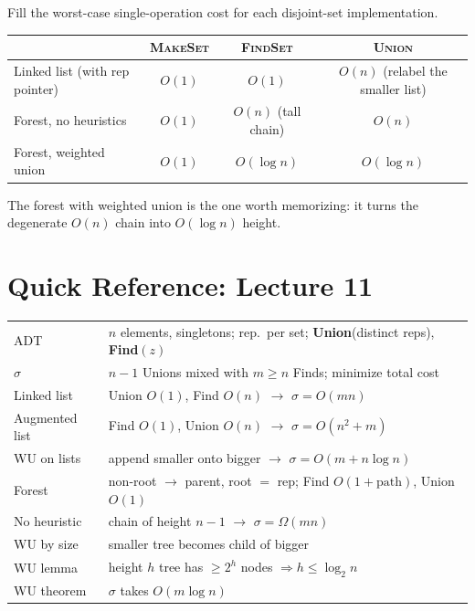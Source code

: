 \documentclass[11pt]{article}
\begin{document}
\begin{examplebox}
Fill the worst-case single-operation cost for each disjoint-set implementation.

\begin{answerband}
\renewcommand{\arraystretch}{1.3}
\begin{center}
\begin{tabular}{l c c c}
 & \textsc{MakeSet} & \textsc{FindSet} & \textsc{Union}\\
\hline
Linked list (with rep pointer) & $O(1)$ & $O(1)$ & $O(n)$ (relabel the smaller list)\\
Forest, no heuristics & $O(1)$ & $O(n)$ (tall chain) & $O(n)$\\
Forest, weighted union & $O(1)$ & $O(\log n)$ & $O(\log n)$\\
\end{tabular}
\end{center}
The forest with weighted union is the one worth memorizing: it turns the degenerate $O(n)$ chain into $O(\log n)$ height.
\end{answerband}
\end{examplebox}

\section*{\textcolor{violetT}{Quick Reference: Lecture 11}}
\begin{keybox}
\renewcommand{\arraystretch}{1.35}
\begin{tabular}{l l}
ADT & $n$ elements, singletons; rep.\ per set; \textbf{Union}(distinct reps), \textbf{Find}$(z)$\\
$\sigma$ & $n-1$ Unions mixed with $m \ge n$ Finds; minimize total cost\\
Linked list & Union $O(1)$, Find $O(n)$ \;$\to$\; $\sigma = O(mn)$\\
Augmented list & Find $O(1)$, Union $O(n)$ \;$\to$\; $\sigma = O(n^2 + m)$\\
WU on lists & append smaller onto bigger \;$\to$\; $\sigma = O(m + n\log n)$\\
Forest & non-root $\to$ parent, root $=$ rep; Find $O(1+\text{path})$, Union $O(1)$\\
No heuristic & chain of height $n-1$ \;$\to$\; $\sigma = \Omega(mn)$\\
WU by size & smaller tree becomes child of bigger\\
WU lemma & height $h$ tree has $\ge 2^h$ nodes $\Rightarrow h \le \log_2 n$\\
WU theorem & $\sigma$ takes \textcolor{violetT}{$O(m\log n)$}\\
\end{tabular}
\end{keybox}
\end{document}
